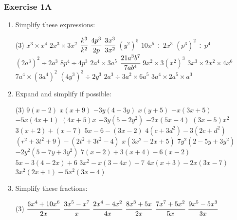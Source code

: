 \documentclass[fleqn]{article}
\newcommand{\exercise}{\subsubsection}
\begin{document}
\exercise{Exercise 1A}
\begin{enumerate}
	\item Simplify these expressions:
		\vspace{-3mm}
		\begin{tasks}(3) %
	    	\task $x^3 \times x^4$					%
	    	\task $2x^3 \times 3x^2$					%
	    	\task $\cfrac{k^3}{k^2}$					%
	    	\task $\cfrac{4p^3}{2p}$					%
	    	\task $\cfrac{3x^3}{3x^2}$				%
	    	\task $(y^2)^5$							%
	    	\task $10x^5 \div 2x^3$					%
	    	\task $(p^3)^2 \div p^4$					%
	    	\task $(2a^3)^2 \div 2a^3$				%
	    	\task $8p^4 \div 4p^3$					%
	    	\task $2a^4 \times 3a^5$					%
	    	\task $\cfrac{21a^3b^7}{7ab^4}$			%
	    	\task $9x^2 \times 3(x^2)^3$				%
	    	\task $3x^3 \times 2x^2 \times 4x^6$		%
	    	\task $7a^4 \times (3a^4)^2$				%
	    	\task $(4y^3)^3 \div 2y^3$				%
	    	\task $2a^3 \div 3a^2 \times 6a^5$		%
	    	\task $3a^4 \times 2a^5 \times a^3$		%
		\end{tasks}

	\vspace{4mm}
	\item Expand and simplify if possible:
		\begin{tasks}(3) %
			\task $9(x-2)$							%
			\task $x(x+9)$							%
			\task $-3y(4-3y)$						%
			\task $x(y+5)$							%
			\task $-x(3x+5)$							%
			\task $-5x(4x+1)$						%
			\task $(4x+5)x$							%
			\task $-3y(5-2y^2)$						%
			\task $-2x(5x-4)$						%
			\task $(3x-5)x^2$						%
			\task $3(x+2) + (x-7)$					%
			\task $5x-6-(3x-2)$						%
			\task $4(c+3d^2)-3(2c+d^2)$				%
			\task $(r^2+3t^2+9)-(2t^2+3t^2-4)$		%
			\task $x(3x^2-2x+5)$						%
			\task $7y^2(2-5y+3y^2)$					%
			\task $-2y^2(5-7y+3y^2)$					%
			\task $7(x-2)+3(x+4)-6(x-2)$				%
			\task $5x-3(4-2x)+6$						%
			\task $3x^2-x(3-4x)+7$					%
			\task $4x(x+3)-2x(3x-7)$					%
			\task $3x^2(2x+1)-5x^2(3x-4)$			%
		\end{tasks}

	\vspace{4mm}
	\item Simplify these fractions:
		\begin{tasks}(3) %
			\task $\cfrac{6x^4+10x^6}{2x}$			%
			\task $\cfrac{3x^5-x^7}{x}$				%
			\task $\cfrac{2x^4-4x^2}{4x}$			%
			\task $\cfrac{8x^3+5x}{2x}$				%
			\task $\cfrac{7x^7+5x^2}{5x}$			%
			\task $\cfrac{9x^5-5x^3}{3x}$			%
		\end{tasks}
\end{enumerate}
\end{document}
